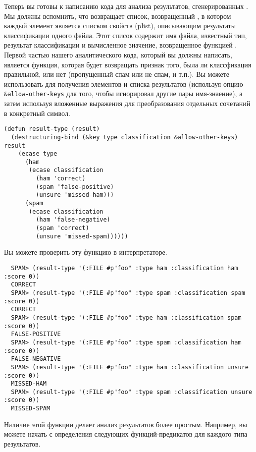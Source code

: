 Теперь вы готовы к написанию кода для анализа результатов, сгенерированных
.  Мы должны вспомнить, что  возвращает
список, возвращенный , в котором каждый элемент является списком
свойств (plist), описывающим результаты классификации одного файла.  Этот список содержит
имя файла, известный тип, результат классификации и вычисленное значение, возвращенное
функцией .  Первой частью нашего аналитического кода, который вы должны
написать, является функция, которая будет возвращать признак того, была ли классфикация
правильной, или нет (пропущенный спам или не спам, и т.п.).  Вы можете использовать
 для получения элементов  и 
списка результатов (используя опцию \lstinline!&allow-other-keys! для того, чтобы
 игнорировал другие пары имя-знаение), а затем используя
вложенные выражения  для преобразования отдельных сочетаний в конкретный
символ.

\begin{lstlisting}
(defun result-type (result)
  (destructuring-bind (&key type classification &allow-other-keys) result
    (ecase type
      (ham
       (ecase classification
         (ham 'correct)
         (spam 'false-positive)
         (unsure 'missed-ham)))
      (spam
       (ecase classification
         (ham 'false-negative)
         (spam 'correct)
         (unsure 'missed-spam))))))
\end{lstlisting}

Вы можете проверить эту функцию в интерпретаторе.

\begin{verbatim}
  SPAM> (result-type '(:FILE #p"foo" :type ham :classification ham :score 0))
  CORRECT
  SPAM> (result-type '(:FILE #p"foo" :type spam :classification spam :score 0))
  CORRECT
  SPAM> (result-type '(:FILE #p"foo" :type ham :classification spam :score 0))
  FALSE-POSITIVE
  SPAM> (result-type '(:FILE #p"foo" :type spam :classification ham :score 0))
  FALSE-NEGATIVE
  SPAM> (result-type '(:FILE #p"foo" :type ham :classification unsure :score 0))
  MISSED-HAM
  SPAM> (result-type '(:FILE #p"foo" :type spam :classification unsure :score 0))
  MISSED-SPAM
\end{verbatim}

Наличие этой функции делает анализ результатов  более простым.
Например, вы можете начать с определения следующих функций-предикатов для каждого типа
результатов.

